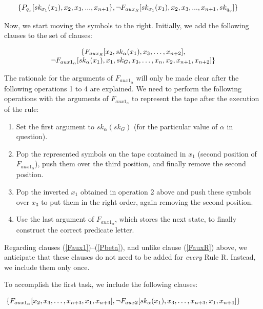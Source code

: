 \documentclass[%
  manuscript=article,   %
  year=2024,
  volume=77,
  doi=00000.000,
]{zfn}
\begin{document}
\begin{equation}
\hspace{-0.5cm} \{P_{q_x}[sk_{\sigma_1}(x_1), x_2, x_3, ..., x_{n+1}\},
 \neg F_{aux_R}[sk_{\sigma_1}(x_1), x_2, x_3, ..., x_{n+1},sk_{q_y}]\} \label{FauxR}
\end{equation}

Now, we start moving the symbols to the right. Initially, we add the following clauses to the set of clauses:

\begin{equation}
\begin{tabular}{c}$\{F_{aux_R}[x_2, sk_\alpha(x_1), x_3, \dots , x_{n+2}],$ \\
$\neg F_{aux1_\alpha}[sk_\alpha(x_1), x_1, sk_G, x_3, \ldots, x_{n}, x_2, x_{n+1},x_{n+2}]\}$\end{tabular} \label{Faux1}
\end{equation}

The rationale for the arguments of $F_{aux1_\alpha}$ will only be made clear after the following operations 1 to 4 are explained. We need to perform the following operations with the arguments of $F_{aux1_\alpha}$ to represent the tape after the execution of the rule:

\begin{enumerate}
\item Set the first argument to $sk_\alpha(sk_G)$ (for the particular value of $\alpha$ in question).
\item Pop the represented symbols on the tape contained in $x_1$ (second position of $F_{aux1_\alpha}$), push them over the third position, and finally remove the second position.
\item Pop the inverted $x_1$ obtained in operation 2 above and push these symbols over $x_3$ to put them in the right order, again removing the second position.
\item Use the last argument of $F_{aux1_\alpha}$, which stores the next state, to finally construct the correct predicate letter.
\end{enumerate}

Regarding clauses (\ref{Faux1})--(\ref{Pbeta}), and unlike clause (\ref{FauxR}) above, we anticipate that these clauses do not need to be added for \textit{every} Rule R. Instead, we include them only once.

To accomplish the first task, we include the following clauses:

\begin{small}
\begin{equation}
  \hspace{-1cm}  \{F_{aux1_\alpha}[x_2, x_3, \ldots, x_{n+3}, x_1, x_{n+4}], \neg F_{aux2}[sk_\alpha(x_1), x_3, \ldots, x_{n+3}, x_1, x_{n+4}]\}\label{Faux2}
\end{equation}
\end{small}
\end{document}
